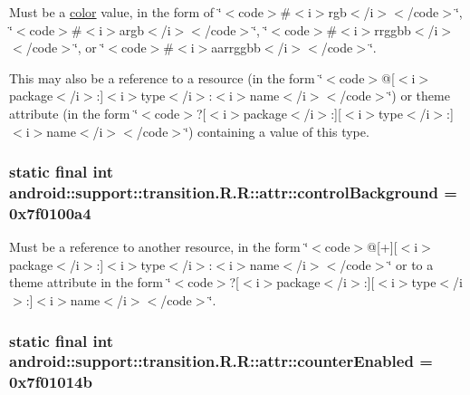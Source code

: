 Must be a \hyperlink{classandroid_1_1support_1_1transition_1_1_r_1_1color}{color} value, in the form of \char`\"{}$<$code$>$\#$<$i$>$rgb$<$/i$>$$<$/code$>$\char`\"{}, \char`\"{}$<$code$>$\#$<$i$>$argb$<$/i$>$$<$/code$>$\char`\"{}, \char`\"{}$<$code$>$\#$<$i$>$rrggbb$<$/i$>$$<$/code$>$\char`\"{}, or \char`\"{}$<$code$>$\#$<$i$>$aarrggbb$<$/i$>$$<$/code$>$\char`\"{}. 

This may also be a reference to a resource (in the form \char`\"{}$<$code$>$@\mbox{[}$<$i$>$package$<$/i$>$:\mbox{]}$<$i$>$type$<$/i$>$:$<$i$>$name$<$/i$>$$<$/code$>$\char`\"{}) or theme attribute (in the form \char`\"{}$<$code$>$?\mbox{[}$<$i$>$package$<$/i$>$:\mbox{]}\mbox{[}$<$i$>$type$<$/i$>$:\mbox{]}$<$i$>$name$<$/i$>$$<$/code$>$\char`\"{}) containing a value of this type. \hypertarget{classandroid_1_1support_1_1transition_1_1_r_1_1attr_50516898b1f98f0a6866f710a2a96a73}{
\subsubsection[{controlBackground}]{\setlength{\rightskip}{0pt plus 5cm}static final int android::support::transition.R.R::attr::controlBackground = 0x7f0100a4}}
\label{classandroid_1_1support_1_1transition_1_1_r_1_1attr_50516898b1f98f0a6866f710a2a96a73}


Must be a reference to another resource, in the form \char`\"{}$<$code$>$@\mbox{[}+\mbox{]}\mbox{[}$<$i$>$package$<$/i$>$:\mbox{]}$<$i$>$type$<$/i$>$:$<$i$>$name$<$/i$>$$<$/code$>$\char`\"{} or to a theme attribute in the form \char`\"{}$<$code$>$?\mbox{[}$<$i$>$package$<$/i$>$:\mbox{]}\mbox{[}$<$i$>$type$<$/i$>$:\mbox{]}$<$i$>$name$<$/i$>$$<$/code$>$\char`\"{}. \hypertarget{classandroid_1_1support_1_1transition_1_1_r_1_1attr_df88e8d3cfe96cb599fc00e43d1e89b2}{
\subsubsection[{counterEnabled}]{\setlength{\rightskip}{0pt plus 5cm}static final int android::support::transition.R.R::attr::counterEnabled = 0x7f01014b}}
\label{classandroid_1_1support_1_1transition_1_1_r_1_1attr_df88e8d3cfe96cb599fc00e43d1e89b2}



